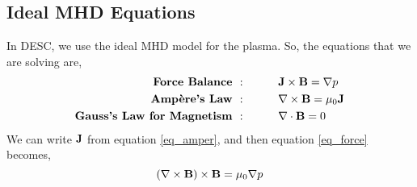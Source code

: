 \subsection{Ideal MHD Equations}

In DESC, we use the ideal MHD model for the plasma. So, the equations that we are solving are,
\begin{align}
    \textbf{Force Balance } &: \hspace{1cm} \mathbf{J}\times\mathbf{B} = \nabla p \label{eq_force}\\
    \textbf{Ampère's Law } &: \hspace{1cm} \nabla\times\mathbf{B} = \mu_0 \mathbf{J} \label{eq_amper}\\
    \textbf{Gauss's Law for Magnetism } &: \hspace{1cm} \nabla\cdot\mathbf{B} = 0 \label{eq_gauss}
\end{align}
We can write $\mathbf{J}$ from equation \ref{eq_amper}, and then equation \ref{eq_force} becomes,
\begin{equation}
    (\nabla\times\mathbf{B})\times\mathbf{B} = \mu_0\nabla p   \label{force-error}
\end{equation}






